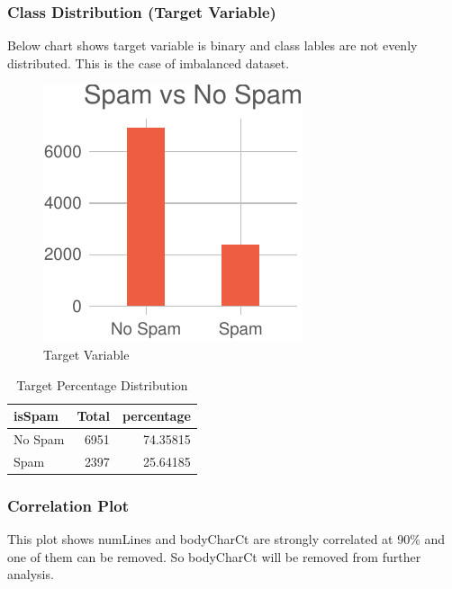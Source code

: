 \documentclass[
]{article}
\begin{document}
\hypertarget{class-distribution-target-variable}{%
\subsubsection{Class Distribution (Target
Variable)}\label{class-distribution-target-variable}}

Below chart shows target variable is binary and class lables are not
evenly distributed. This is the case of imbalanced dataset.

\begin{figure}[H]

{\centering \includegraphics{case_study03_files/figure-latex/unnamed-chunk-12-1} 

}

\caption{Target Variable}\label{fig:unnamed-chunk-12}
\end{figure}

\begin{table}[!h]

\caption{\label{tab:unnamed-chunk-13}Target Percentage Distribution}
\centering
\begin{tabular}[t]{lrr}
\toprule
isSpam & Total & percentage\\
\midrule
No Spam & 6951 & 74.35815\\
Spam & 2397 & 25.64185\\
\bottomrule
\end{tabular}
\end{table}

\hypertarget{correlation-plot}{%
\subsubsection{Correlation Plot}\label{correlation-plot}}

This plot shows numLines and bodyCharCt are strongly correlated at 90\%
and one of them can be removed. So bodyCharCt will be removed from
further analysis.
\end{document}
